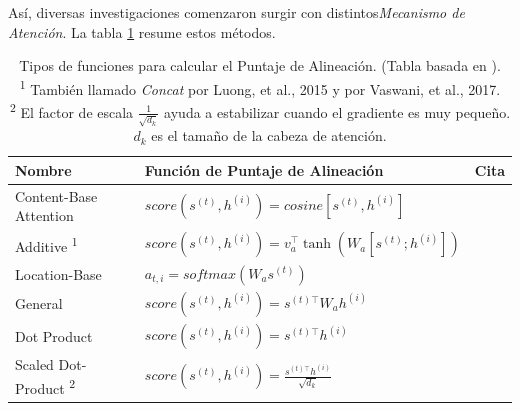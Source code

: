 Así, diversas investigaciones comenzaron surgir con distintos\textit{Mecanismo de Atención}. La tabla
\ref{Tab:att} resume estos métodos.

\begin{table}[]
\begin{center}
\begin{tabular}{@{}lll@{}}
\toprule
\textbf{Nombre} & \textbf{Función de Puntaje de Alineación} & \textbf{Cita} \\ \midrule
Content-Base Attention & $score(s^{(t)}, h^{(i)}) = cosine[s^{(t)}, h^{(i)}]$ & \cite[Graves 2014]{DBLP:journals/corr/GravesWD14} \\
Additive \textsuperscript{1} & $score(s^{(t)}, h^{(i)}) = v^\top_a \tanh(W_a[s^{(t)};h^{(i)}])$ &  \cite[Bahdanau 2015]{bahdanau2016neural}  \\
Location-Base & $a_{t,i} = softmax(W_a s^{(t)})$ & \cite[Luong 2015]{DBLP:journals/corr/LuongPM15} \\
General & $score(s^{(t)}, h^{(i)}) = s^{(t)\top} W_a h^{(i)}$ &  \cite[Luong 2015]{DBLP:journals/corr/LuongPM15} \\
Dot Product & $score(s^{(t)}, h^{(i)}) = s^{(t)\top} h^{(i)}$ &  \cite[Luong 2015]{DBLP:journals/corr/LuongPM15} \\
Scaled Dot-Product \textsuperscript{2} & $score(s^{(t)}, h^{(i)}) = \frac{s^{(t)\top} h^{(i)}}{\sqrt{d_k}}$ &  \cite[Vaswani 2017]{DBLP:journals/corr/VaswaniSPUJGKP17} \\ \bottomrule
\end{tabular}
\end{center}
\caption{Tipos de funciones para calcular el Puntaje de Alineación. (Tabla basada en \cite{weng2018attention}). \\
\textsuperscript{1} También llamado \textit{Concat} por Luong, et al., 2015 y
 por Vaswani, et al., 2017.\\
\textsuperscript{2} El factor de escala $\frac{1}{\sqrt{d_k}}$ ayuda a estabilizar cuando el
gradiente es muy pequeño. $d_k$ es el tamaño de la cabeza de atención.
\label{Tab:att}}
\end{table}
